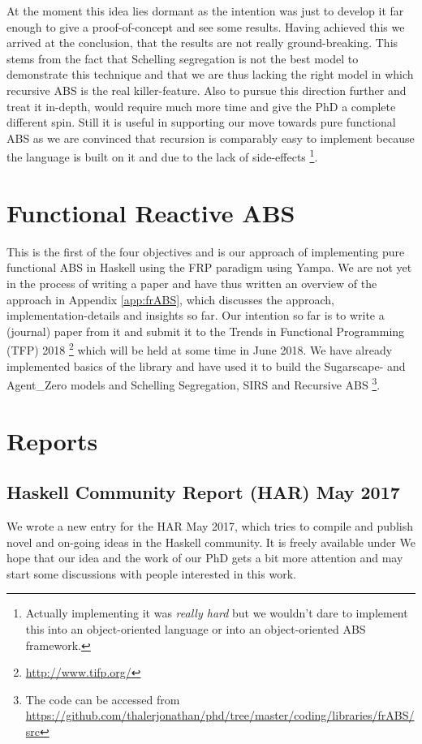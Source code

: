 At the moment this idea lies dormant as the intention was just to develop it far enough to give a proof-of-concept and see some results. Having achieved this we arrived at the conclusion, that the results are not really ground-breaking. This stems from the fact that Schelling segregation is not the best model to demonstrate this technique and that we are thus lacking the right model in which recursive ABS is the real killer-feature. Also to pursue this direction further and treat it in-depth, would require much more time and give the PhD a complete different spin. Still it is useful in supporting our move towards pure functional ABS as we are convinced that recursion is comparably easy to implement because the language is built on it and due to the lack of side-effects \footnote{Actually implementing it was \textit{really hard} but we wouldn't dare to implement this into an object-oriented language or into an object-oriented ABS framework.}.

\section{Functional Reactive ABS}
This is the first of the four objectives and is our approach of implementing pure functional ABS in Haskell using the FRP paradigm using Yampa. We are not yet in the process of writing a paper and have thus written an overview of the approach in Appendix \ref{app:frABS}, which discusses the approach, implementation-details and insights so far. 
Our intention so far is to write a (journal) paper from it and submit it to the Trends in Functional Programming (TFP) 2018 \footnote{\url{http://www.tifp.org/}} which will be held at some time in June 2018.
We have already implemented basics of the library and have used it to build the Sugarscape- and Agent\_Zero models and Schelling Segregation, SIRS and Recursive ABS \footnote{The code can be accessed from \url{https://github.com/thalerjonathan/phd/tree/master/coding/libraries/frABS/src}}.

\section{Reports}
\subsection{Haskell Community Report (HAR) May 2017}
We wrote a new entry for the HAR May 2017, which tries to compile and publish novel and on-going ideas in the Haskell community. It is freely available under %
We hope that our idea and the work of our PhD gets a bit more attention and may start some discussions with people interested in this work.


